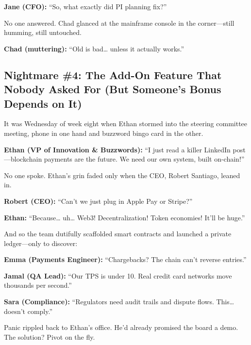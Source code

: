 \medskip

\textbf{Jane (CFO):} “So, what exactly did PI planning fix?”

\medskip

No one answered. Chad glanced at the mainframe console in the corner—still  
humming, still untouched.

\medskip

\textbf{Chad (muttering):} “Old is bad… unless it actually works.”

\subsection{Nightmare \#4: The Add-On Feature That Nobody Asked For (But Someone’s Bonus Depends on It)}

It was Wednesday of week eight when Ethan stormed into the steering committee  
meeting, phone in one hand and buzzword bingo card in the other.

\medskip

\textbf{Ethan (VP of Innovation \& Buzzwords):} “I just read a killer LinkedIn  
post—blockchain payments are the future. We need our own system, built on-chain!”

\medskip

No one spoke. Ethan’s grin faded only when the CEO, Robert Santiago, leaned in.

\medskip

\textbf{Robert (CEO):} “Can’t we just plug in Apple Pay or Stripe?”

\medskip

\textbf{Ethan:} “Because… uh… Web3! Decentralization! Token economies!  
It’ll be huge.”

\medskip

And so the team dutifully scaffolded smart contracts and launched a private  
ledger—only to discover:

\medskip

\textbf{Emma (Payments Engineer):} “Chargebacks? The chain can’t reverse entries.”

\medskip

\textbf{Jamal (QA Lead):} “Our TPS is under 10. Real credit card networks move  
thousands per second.”

\medskip

\textbf{Sara (Compliance):} “Regulators need audit trails and dispute flows.  
This… doesn’t comply.”

\medskip

Panic rippled back to Ethan’s office. He’d already promised the board a demo.  
The solution? Pivot on the fly.

